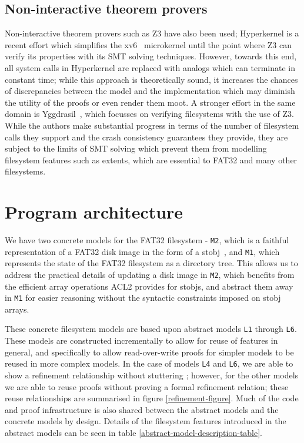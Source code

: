 \documentclass[submission,copyright,creativecommons]{eptcs}
\begin{document}
\subsection{Non-interactive theorem provers}
Non-interactive theorem provers such as Z3 \cite{de2008z3}
have also been used; Hyperkernel
\cite{Nelson:2017:HPV:3132747.3132748} is a recent effort which
simplifies the xv6~\cite{cox6xv6} microkernel until the
point where Z3 can verify its properties with its SMT solving
techniques. However, towards this end, all system calls in Hyperkernel
are replaced with analogs which can terminate in constant time; while
this approach is theoretically sound, it increases the chances of
discrepancies between the model and
the implementation which may diminish the utility of the proofs or
even render them moot. A stronger effort in the same domain is
Yggdrasil~\cite{sigurbjarnarson2016push}, which focusses on verifying
filesystems with the use of Z3. While the authors make substantial
progress in terms of the number of filesystem calls they support and
the crash consistency guarantees they provide, they are subject to
the limits of SMT solving which prevent them from modelling filesystem
features such as extents, which are essential to FAT32 and many other
filesystems.

\section{Program architecture}

We have two concrete models for the FAT32 filesystem - \texttt{M2},
which is a faithful representation of a FAT32 disk image in the form
of a stobj~\cite{boyer2002single}, and \texttt{M1}, which represents the
state of the FAT32 filesystem as a directory tree. This allows us to
address the practical details of updating a disk image in \texttt{M2},
which benefits from the efficient array operations ACL2 provides
for stobjs, and abstract them away in \texttt{M1} for easier reasoning
without the syntactic constraints imposed on stobj arrays.

These concrete filesystem models are based upon abstract models
\texttt{L1} through \texttt{L6}. These models are constructed
incrementally to allow for reuse of features in general, and
specifically to allow read-over-write proofs for simpler models to be
reused in more complex models. In the case of models \texttt{L4} and
\texttt{L6}, we are able to show a refinement relationship
without stuttering \cite{abadi1991existence}; however, for the other
models we are able to reuse proofs without proving a formal refinement
relation; these reuse relationships are summarised in figure
\ref{refinement-figure}. Much of the code and proof infrastructure is
also shared between the abstract models and the concrete models by
design. Details of the filesystem features introduced in the abstract
models can be seen in table \ref{abstract-model-description-table}.
\end{document}
